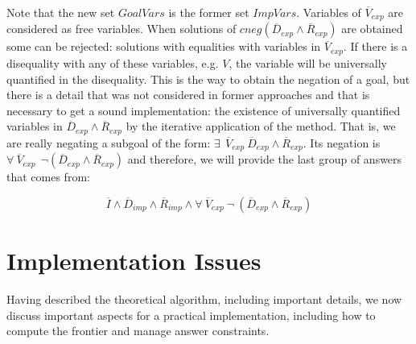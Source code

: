 \documentclass{tlp}
\begin{document}
\begin{itemize}
           Note that the new set $GoalVars$ is the former set
           $ImpVars$. Variables of $\overline{V}_{exp}$ are considered
           as free variables. When solutions of
           $cneg(\overline{D}_{exp} \wedge \overline{R}_{exp})$ are
           obtained some can be rejected: solutions with equalities
           with variables in $\overline{V}_{exp}$. If there is a
           disequality with any of these variables, e.g. $V$, the
           variable will be universally quantified in the disequality.
           This is the way to obtain the negation of a goal, but there
           is a detail that was not considered in former approaches
           and that is necessary to get a sound implementation: the
           existence of universally quantified variables in
           $\overline{D}_{exp} \wedge \overline{R}_{exp}$ by the
           iterative application of the method. That is, we are really
           negating a subgoal of the form: $ \exists~~
           \overline{V}_{exp}~ \overline{D}_{exp} \wedge
           \overline{R}_{exp}$. Its negation is $\forall~
           \overline{V}_{exp}~~ \neg(\overline{D}_{exp} \wedge
           \overline{R}_{exp})$ and therefore, we will provide the
           last group of answers that comes from:

           \[\overline{I} \wedge \overline{D}_{imp}
           \wedge \overline{R}_{imp} \wedge \forall~
           \overline{V}_{exp}~ \neg~(\overline{D}_{exp} \wedge
           \overline{R}_{exp})\]

         \end{itemize}


    


\section{Implementation Issues}
\label{implementation}

Having described the theoretical algorithm, including important
details, we now discuss important aspects for a practical
implementation, including how to compute the frontier and manage
answer constraints.


\vspace{-0.1in}
\end{document}
